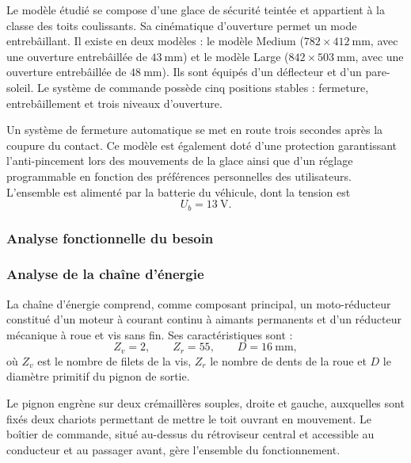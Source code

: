 Le modèle étudié se compose d'une glace de sécurité teintée et appartient à la
classe des toits coulissants. Sa cinématique d'ouverture permet un mode
entrebâillant. Il existe en deux modèles : le modèle Medium
($782\times412~\mathrm{mm}$, avec une ouverture entrebâillée de
$43~\mathrm{mm}$) et le modèle Large ($842\times503~\mathrm{mm}$, avec une
ouverture entrebâillée de $48~\mathrm{mm}$). Ils sont équipés d'un déflecteur et
d'un pare-soleil. Le système de commande possède cinq positions stables :
fermeture, entrebâillement et trois niveaux d'ouverture.

Un système de fermeture automatique se met en route trois secondes après la
coupure du contact. Ce modèle est également doté d'une protection garantissant
l'anti-pincement lors des mouvements de la glace ainsi que d'un réglage
programmable en fonction des préférences personnelles des utilisateurs.
L'ensemble est alimenté par la batterie du véhicule, dont la tension est
\[
  U_b=13~\mathrm{V}.
\]


\subsubsection*{Analyse fonctionnelle du besoin}

\subsubsection*{Analyse de la chaîne d'énergie}

La chaîne d'énergie comprend, comme composant principal, un moto-réducteur
constitué d'un moteur à courant continu à aimants permanents et d'un réducteur
mécanique à roue et vis sans fin. Ses caractéristiques sont :
\[
  Z_v=2,\qquad Z_r=55,\qquad D=16~\mathrm{mm},
\]
où $Z_v$ est le nombre de filets de la vis, $Z_r$ le nombre de dents de la
roue et $D$ le diamètre primitif du pignon de sortie.

Le pignon engrène sur deux crémaillères souples, droite et gauche, auxquelles
sont fixés deux chariots permettant de mettre le toit ouvrant en mouvement. Le
boîtier de commande, situé au-dessus du rétroviseur central et accessible au
conducteur et au passager avant, gère l'ensemble du fonctionnement.


